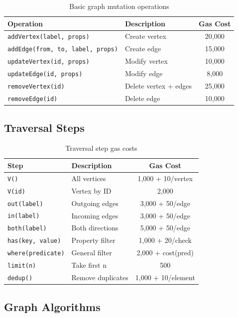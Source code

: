 \documentclass[11pt,a4paper]{article}
\theoremstyle{definition}
\begin{document}
\begin{table}[h]
\centering
\begin{tabular}{@{}llc@{}}
\toprule
Operation & Description & Gas Cost \\
\midrule
\texttt{addVertex(label, props)} & Create vertex & 20,000 \\
\texttt{addEdge(from, to, label, props)} & Create edge & 15,000 \\
\texttt{updateVertex(id, props)} & Modify vertex & 10,000 \\
\texttt{updateEdge(id, props)} & Modify edge & 8,000 \\
\texttt{removeVertex(id)} & Delete vertex + edges & 25,000 \\
\texttt{removeEdge(id)} & Delete edge & 10,000 \\
\bottomrule
\end{tabular}
\caption{Basic graph mutation operations}
\end{table}

\subsection{Traversal Steps}

\begin{table}[h]
\centering
\begin{tabular}{@{}llc@{}}
\toprule
Step & Description & Gas Cost \\
\midrule
\texttt{V()} & All vertices & 1,000 + 10/vertex \\
\texttt{V(id)} & Vertex by ID & 2,000 \\
\texttt{out(label)} & Outgoing edges & 3,000 + 50/edge \\
\texttt{in(label)} & Incoming edges & 3,000 + 50/edge \\
\texttt{both(label)} & Both directions & 5,000 + 50/edge \\
\texttt{has(key, value)} & Property filter & 1,000 + 20/check \\
\texttt{where(predicate)} & General filter & 2,000 + cost(pred) \\
\texttt{limit(n)} & Take first n & 500 \\
\texttt{dedup()} & Remove duplicates & 1,000 + 10/element \\
\bottomrule
\end{tabular}
\caption{Traversal step gas costs}
\end{table}

\subsection{Graph Algorithms}
\end{document}
